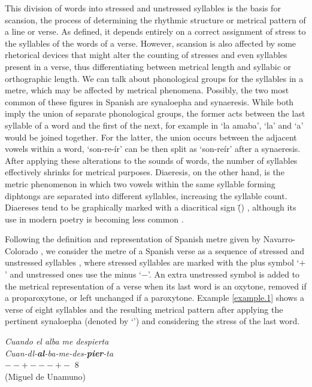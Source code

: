 \documentclass[a4paper,11pt,twocolumn,twoside]{article}
\begin{document}
This division of words into stressed and unstressed syllables is the basis for scansion, the process of determining the rhythmic structure or metrical pattern of a line or verse. As defined, it depends entirely on a correct assignment of stress to the syllables of the words of a verse. However, scansion is also affected by some rhetorical devices that might alter the counting of stresses and even syllables present in a verse, thus differentiating between metrical length and syllabic or orthographic length. We can talk about phonological groups for the syllables in a metre, which may be affected by metrical phenomena. Possibly, the two most common of these figures in Spanish are synaloepha and synaeresis. While both imply the union of separate phonological groups, the former acts between the last syllable of a word and the first of the next, for example in `la amaba', `la' and `a' would be joined together. For the latter, the union occurs between the adjacent vowels within a word, `son-re-ír' can be then split as `son-reír' after a synaeresis. After applying these alterations to the sounds of words, the number of syllables effectively shrinks for metrical purposes. Diaeresis, on the other hand, is the metric phenomenon in which two vowels within the same syllable forming diphtongs are separated into different syllables, increasing the syllable count. Diaereses tend to be graphically marked with a diacritical sign (\"{ }) \cite{caparros2014teoria}, although its use in modern poetry is becoming less common \cite{torre2000metrica}.

Following the definition and representation of Spanish metre given by Navarro-Colorado \cite{navarro2017metrical}, we consider the metre of a Spanish verse as a sequence of stressed and unstressed syllables \cite{quilis1969metrica,navarro1991metrica,caparros1993metrica,merino2005manual}, where stressed syllables are marked with the plus symbol `$+$' and unstressed ones use the minus `$-$'. An extra unstressed symbol is added to the metrical representation of a verse when its last word is an oxytone, removed if a proparoxytone, or left unchanged if a paroxytone. Example \ref{example.1} shows a verse of eight syllables and the resulting metrical pattern after applying the pertinent synaloepha (denoted by `\textbottomtiebar{ }') and considering the stress of the last word.

\begin{subexamples}\label{example.1}
\textit{Cuando el alba me despierta} \\
\textit{Cuan-dl-\textbf{al}-ba-me-des-\textbf{pier}-ta} \\
$--+---+-$ 8 \\
(Miguel de Unamuno)
\end{subexamples}
\end{document}
